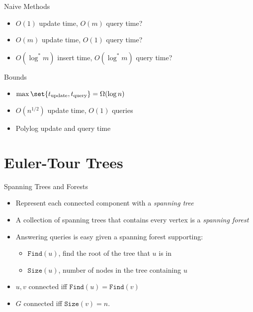 \documentclass[aspectratio=169, handout]{beamer}
\newcommand{\findET}{\texttt{Find}}
\newcommand{\sizeET}{\texttt{Size}}
\begin{document}
\begin{frame}{Naive Methods}
    \begin{itemize}
        \item $O(1)$ update time, $O(m)$ query time?
              \pause
        \item $O(m)$ update time, $O(1)$ query time?
              \pause
        \item $O(\log^* m)$ insert time, $O(\log^* m)$ query time?
              \pause
    \end{itemize}
\end{frame}

\begin{frame}{Bounds}
    \begin{itemize}
        \item $\max \set{t_{\text{update}}, t_{\text{query}}} = \Omega(\log n)$ \parencite{pǎtraşcu04-06}
              \pause
        \item $O(n^{1/2})$ update time, $O(1)$ queries \parencite{eppstein97-09}
              \pause
        \item Polylog update and query time \parencite{kapron13-01}
    \end{itemize}
\end{frame}


\section{Euler-Tour Trees}
\frame{\tableofcontents[currentsection]}

\begin{frame}{Spanning Trees and Forests}
    \begin{itemize}
        \item Represent each connected component with a \emph{spanning tree}
        \item A collection of spanning trees that contains every vertex is a \emph{spanning forest}
              \pause
        \item Answering queries is easy given a spanning forest supporting:
              \begin{itemize}
                  \item $\findET(u)$, find the root of the tree that $u$ is in
                  \item $\sizeET(u)$, number of nodes in the tree containing $u$
              \end{itemize}
              \pause
        \item $u, v$ connected iff $\findET(u) = \findET(v)$
        \item $G$ connected iff $\sizeET(v) = n$.
    \end{itemize}
\end{frame}
\end{document}
